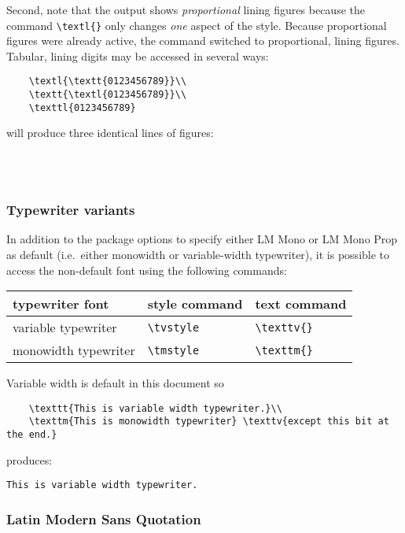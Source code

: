 \documentclass[11pt,british]{article}
\begin{document}
Second, note that the output shows \emph{proportional} lining figures because the command \verb|\textl{}| only changes \emph{one} aspect of the style. Because proportional figures were already active, the command switched to proportional, lining figures. Tabular, lining digits may be accessed in several ways:
\begin{verbatim}
	\textl{\textt{0123456789}}\\
	\textt{\textl{0123456789}}\\
	\texttl{0123456789}
\end{verbatim}
will produce three identical lines of figures:
\begin{center}
	\\
	\\
\end{center}

\subsubsection{Typewriter variants}

In addition to the package options to specify either LM Mono or LM Mono Prop as default (i.e.\ either monowidth or variable-width typewriter), it is possible to access the non-default font using the following commands:
	\begin{longtable}{lll}
		\toprule
		\textbf{typewriter font}	&	\textbf{style command}	&	\textbf{text command}\\\midrule\endhead
		\bottomrule\endfoot
		variable typewriter				&	\verb|\tvstyle|					&	\verb|\texttv{}|\\
		monowidth typewriter		&	\verb|\tmstyle|					&	\verb|\texttm{}|				
	\end{longtable}

Variable width is default in this document so
\begin{verbatim}
	\texttt{This is variable width typewriter.}\\
	\texttm{This is monowidth typewriter} \texttv{except this bit at the end.}
\end{verbatim}
produces:
\begin{center}
	\texttt{This is variable width typewriter.}\\
	 
\end{center}

\subsubsection{Latin Modern Sans Quotation}
\end{document}
